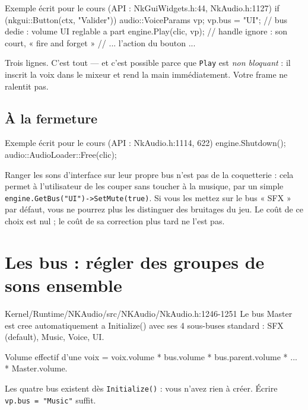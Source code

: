 \begin{nkcode}{Exemple écrit pour le cours (API : NkGuiWidgets.h:44, NkAudio.h:1127)}
if (nkgui::Button(ctx, "Valider")) {
    audio::VoiceParams vp;
    vp.bus = "UI";                       // bus dedie : volume UI reglable a part
    engine.Play(clic, vp);               // handle ignore : son court, « fire and forget »
    // ... l'action du bouton ...
}
\end{nkcode}

Trois lignes. C'est tout — et c'est possible parce que \texttt{Play} est
\emph{non bloquant} : il inscrit la voix dans le mixeur et rend la main
immédiatement. Votre frame ne ralentit pas.

\subsection{À la fermeture}

\begin{nkcode}{Exemple écrit pour le cours (API : NkAudio.h:1114, 622)}
engine.Shutdown();
audio::AudioLoader::Free(clic);
\end{nkcode}

\begin{nkretenir}
Ranger les sons d'interface sur leur propre bus n'est pas de la coquetterie :
cela permet à l'utilisateur de les couper sans toucher à la musique, par un
simple \texttt{engine.GetBus("UI")->SetMute(true)}. Si vous les mettez sur le bus
« SFX » par défaut, vous ne pourrez plus les distinguer des bruitages du jeu.
Le coût de ce choix est nul ; le coût de sa correction plus tard ne l'est pas.
\end{nkretenir}

\section{Les bus : régler des groupes de sons ensemble}

\begin{nkcode}{Kernel/Runtime/NKAudio/src/NKAudio/NkAudio.h:1246-1251}
 Le bus Master est cree automatiquement a Initialize() avec ses
 4 sous-buses standard : SFX (default), Music, Voice, UI.

 Volume effectif d'une voix = voix.volume * bus.volume *
                              bus.parent.volume * ... * Master.volume.
\end{nkcode}

Les quatre bus existent dès \texttt{Initialize()} : vous n'avez rien à créer.
Écrire \texttt{vp.bus = "Music"} suffit.

